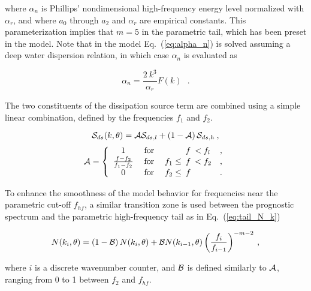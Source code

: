 \noindent
where $\alpha_n$ is Phillips' nondimensional high-frequency energy level
normalized with $\alpha_r$, and where $a_0$ through $a_2$ and $\alpha_r$ are
empirical constants. This parameterization implies that $m = 5$ in the
parametric tail, which has been preset in the model. Note that in the model
Eq.~(\ref{eq:alpha_n}) is solved assuming a deep water dispersion relation, in
which case $\alpha_n$ is evaluated as

\begin{equation}
\alpha_n = \frac{2 \: k^3}{\alpha_r}  F(k)
\:\:\: . \label{eq:alpha_n_mod} \end{equation}

\noindent
The two constituents of the dissipation source term are combined using a
simple linear combination, defined by the frequencies $f_1$ and $f_2$.


\begin{equation}
\cS_{ds}(k,\theta) = {\cal{A}} \cS_{ds,l} +
\left ( 1 - {\cal{A}} \right ) \cS_{ds,h}
\: , \label{eq:TCdtot} \end{equation} \begin{equation}
{\cal A} = \left \{ \begin{array}{ccrclc}
  1  & \;{\rm for}\; &          &\!\!\!f& \!\!\! < f_l & ,\\
\frac{ f-f_2}{f_1-f_2}
     & \;{\rm for}\; & f_1 \leq &\!\!\!f& \!\!\! < f_2 & ,\\
  0  & \;{\rm for}\; & f_2 \leq &\!\!\!f&              & .
\end{array} \right . \label{eq:filt_A} \end{equation}

\noindent
To enhance the smoothness of the model behavior for frequencies near the
parametric cut-off $f_{hf}$, a similar transition zone is used between the
prognostic spectrum and the parametric high-frequency tail as in
Eq.~(\ref{eq:tail_N_k})


\begin{equation}
N(k_i,\theta) = \left ( 1 - {\cal{B}} \right ) N(k_{i},\theta) +
{\cal{B}} N(k_{i-1},\theta) \left ( \frac{f_i}{f_{i-1}}\right ) ^{-m-2}
\: , \label{eq:smtail}
\end{equation}

\noindent
where $i$ is a discrete wavenumber counter, and $\cal{B}$ is defined
similarly to $\cal{A}$, ranging from 0 to 1 between $f_2$ and $f_{hf}$.

